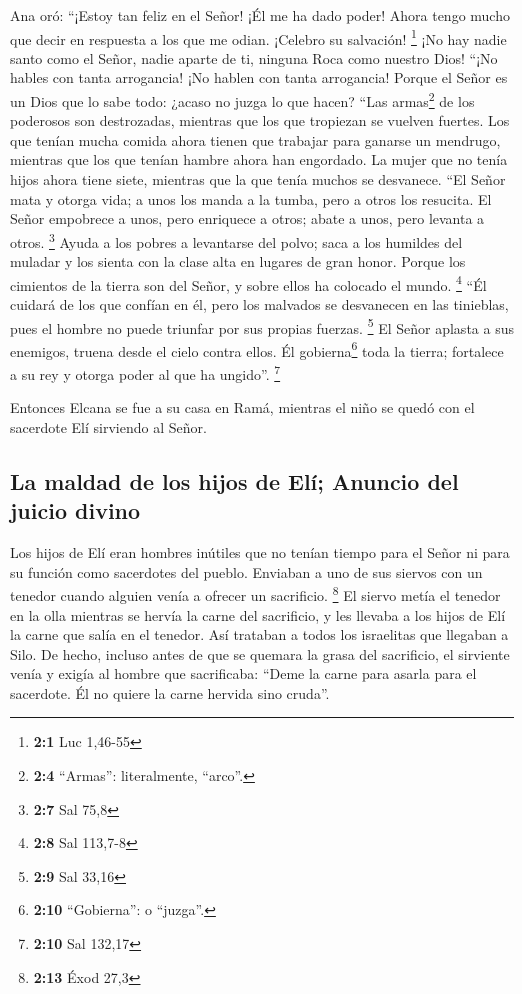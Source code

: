  Ana oró: ``¡Estoy tan feliz en el Señor! ¡Él me ha dado
poder! Ahora tengo mucho que decir en respuesta a los que me odian.
¡Celebro su salvación! \footnote{\textbf{2:1} Luc 1,46-55}
 ¡No hay nadie santo como el Señor, nadie aparte de ti,
ninguna Roca como nuestro Dios!  ``¡No hables con tanta
arrogancia! ¡No hablen con tanta arrogancia! Porque el Señor es un Dios
que lo sabe todo: ¿acaso no juzga lo que hacen?  ``Las
armas\footnote{\textbf{2:4} ``Armas'': literalmente, ``arco''.} de los
poderosos son destrozadas, mientras que los que tropiezan se vuelven
fuertes.  Los que tenían mucha comida ahora tienen que
trabajar para ganarse un mendrugo, mientras que los que tenían hambre
ahora han engordado. La mujer que no tenía hijos ahora tiene siete,
mientras que la que tenía muchos se desvanece.  ``El Señor
mata y otorga vida; a unos los manda a la tumba, pero a otros los
resucita.  El Señor empobrece a unos, pero enriquece a
otros; abate a unos, pero levanta a otros. \footnote{\textbf{2:7} Sal
  75,8}  Ayuda a los pobres a levantarse del polvo; saca a
los humildes del muladar y los sienta con la clase alta en lugares de
gran honor. Porque los cimientos de la tierra son del Señor, y sobre
ellos ha colocado el mundo. \footnote{\textbf{2:8} Sal 113,7-8}
 ``Él cuidará de los que confían en él, pero los malvados
se desvanecen en las tinieblas, pues el hombre no puede triunfar por sus
propias fuerzas. \footnote{\textbf{2:9} Sal 33,16}  El
Señor aplasta a sus enemigos, truena desde el cielo contra ellos. Él
gobierna\footnote{\textbf{2:10} ``Gobierna'': o ``juzga''.} toda la
tierra; fortalece a su rey y otorga poder al que ha ungido''.
\footnote{\textbf{2:10} Sal 132,17}

 Entonces Elcana se fue a su casa en Ramá, mientras el
niño se quedó con el sacerdote Elí sirviendo al Señor.

\hypertarget{la-maldad-de-los-hijos-de-eluxed-anuncio-del-juicio-divino}{%
\subsection{La maldad de los hijos de Elí; Anuncio del juicio
divino}\label{la-maldad-de-los-hijos-de-eluxed-anuncio-del-juicio-divino}}

 Los hijos de Elí eran hombres inútiles que no tenían
tiempo para el Señor  ni para su función como sacerdotes
del pueblo. Enviaban a uno de sus siervos con un tenedor cuando alguien
venía a ofrecer un sacrificio. \footnote{\textbf{2:13} Éxod 27,3}
 El siervo metía el tenedor en la olla mientras se hervía
la carne del sacrificio, y les llevaba a los hijos de Elí la carne que
salía en el tenedor. Así trataban a todos los israelitas que llegaban a
Silo.  De hecho, incluso antes de que se quemara la grasa
del sacrificio, el sirviente venía y exigía al hombre que sacrificaba:
``Deme la carne para asarla para el sacerdote. Él no quiere la carne
hervida sino cruda''.

